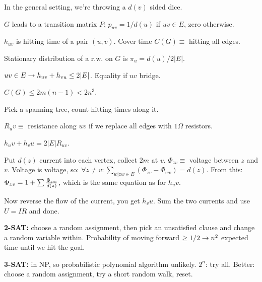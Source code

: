 In the general setting, we're throwing a $d(v)$ sided dice.

\dfn{} $G$ leads to a transition matrix $P$; $p_{uv} = 1/d(u)$ if $uv \in E$, zero otherwise.

\dfn{} $h_{uv}$ is hitting time of a pair $(u,v)$. Cover time $C(G) \equiv$ hitting all edges.

\thm{} Stationary distribution of a r.w. on $G$ is $\pi_{u} = d(u)/2|E|$. 

\thm{} $uv \in E \rightarrow h_{uv} + h_{vu} \le 2|E|$. Equality if $uv$ bridge.

\thm{} $C(G) \le  2m(n-1) < 2n^3$. 

\prf{} Pick a spanning tree, count hitting times along it.

\dfn{} $R_uv \equiv$ resistance along $uv$ if we replace all edges with $1\Omega$ resistors.

\thm{} $h_uv + h_vu = 2|E|R_{uv}$.

\prf{} Put $d(z)$ current into each vertex, collect $2m$ at $v$.
$\Phi_{zv} \equiv$ voltage between $z$ and $v$. Voltage is voltage, so:
$\forall z \ne v:  \sum_{w|zw \in E}(\Phi_{zv} - \Phi_{wv}) = d(z)$. From this:
$\Phi_{zv} = 1 + \sum {\Phi_{zw} \over d(z)}$, which is the same equation as
for $h_uv$.

Now reverse the flow of the current, you get $h_vu$. Sum the two currents and
use $U=IR$ and done.

{\bf 2-SAT:} choose a random assignment, then pick an unsatisfied clause and
change a random variable within. Probability of moving forward $\ge 1/2 \rightarrow
n^2$ expected time until we hit the goal.

{\bf 3-SAT:} in NP, so probabilistic polynomial algorithm unlikely. $2^n$: try all.
Better: choose a random assignment, try a short random walk, reset.






\bye
